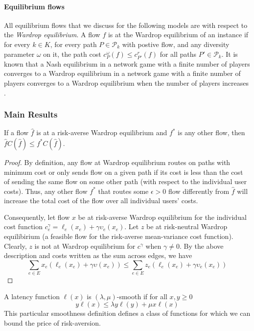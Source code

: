 \paragraph{Equilibrium flows} All equilibrium flows that we discuss for the following models are with respect to the {\it Wardrop equilibrium}. A flow $f$ is at the Wardrop equilibrium of an instance if for every $k\in K$, for every path $P\in \mathcal{P}_k$ with postive flow, and any diversity parameter $\omega$ on it, the path cost $c_P^\omega(f)\le c_{P'}^r(f)$ for all paths $P'\in \mathcal{P}_k$. It is known that a Nash equilibrium in a network game with a finite number of players converges to a Wardrop equilibrium in a network game with a finite number of players converges to a Wardrop equilibrium when the number of players increases \cite{haurie}.


\subsubsection{Main Results}
\begin{theorem}
    If a flow $\hat{f}$ is at a risk-averse Wardrop equilibrium and $f^*$ is any other flow, then $\hat{f}C(\hat{f})\leq f^*C(\hat{f})$. 
    \label{variational}
\end{theorem}

\begin{proof}
    By definition, any flow at Wardrop equilibrium routes on paths with minimum cost or only sends flow on a given path if its cost is less than
    the cost of sending the same flow on some other path (with respect to the individual user costs). 
    Thus, any other flow $f^*$ that routes some $\epsilon > 0$ flow differently from $\hat{f}$ will increase the total cost of the flow over all individual users' costs.

    Consequently, let flow $x$ be at risk-averse Wardrop equilibrium for the individual cost function $c^\gamma_e = \ell_e(x_e) +\gamma \upsilon_e(x_e)$. Let $z$ be at risk-neutral Wardrop equilibirium (a feasible flow for the risk-averse mean-variance cost function). 
    Clearly, $z$ is not at Wardrop equilibrium for $c^\gamma$ when $\gamma \neq 0$. 
    By the above description and costs written as the sum across edges, we have
    $$\sum_{e \in E}x_e(\ell_e(x_e) + \gamma \upsilon(x_e)) \leq \sum_{e \in E} z_e(\ell_e(x_e) + \gamma \upsilon_e(x_e))$$
\end{proof}

\begin{definition}
    A latency function $\ell(x)$ is $(\lambda, \mu)$-smooth if for all $x, y \geq 0$ $$ y\ell(x) \leq \lambda y\ell(y) + \mu x \ell(x)$$
    This particular smoothness definition defines a class of functions for which we can bound the price of risk-aversion.
\end{definition}

